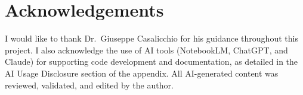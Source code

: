 \chapter*{Acknowledgements}
I would like to thank Dr.\ Giuseppe Casalicchio for his guidance throughout this project.
I also acknowledge the use of AI tools (NotebookLM, ChatGPT, and Claude) for supporting code development and documentation, as detailed in the AI Usage Disclosure section of the appendix.
All AI-generated content was reviewed, validated, and edited by the author.
